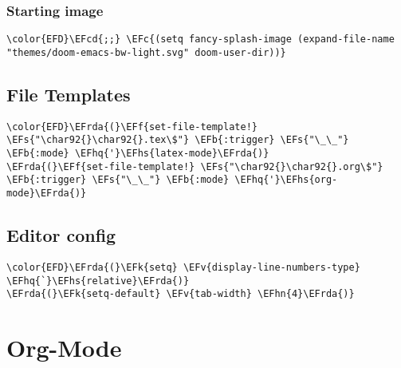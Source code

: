 \documentclass[12pt]{article}
\theoremstyle{plain}%
\theoremstyle{definition}
\theoremstyle{remark}
\newcommand{\EFc}[1]{\textcolor{EFc}{#1}} %
\newcommand{\EFcd}[1]{\textcolor{EFcd}{#1}} %
\newcommand{\EFs}[1]{\textcolor{EFs}{#1}} %
\newcommand{\EFk}[1]{\textcolor{EFk}{#1}} %
\newcommand{\EFb}[1]{\textcolor{EFb}{#1}} %
\newcommand{\EFf}[1]{\textcolor{EFf}{#1}} %
\newcommand{\EFv}[1]{\textcolor{EFv}{#1}} %
\newcommand{\EFhn}[1]{\textcolor{EFhn}{\textbf{#1}}} %
\newcommand{\EFhq}[1]{\textcolor{EFhq}{#1}} %
\newcommand{\EFhs}[1]{\textcolor{EFhs}{#1}} %
\newcommand{\EFrda}[1]{\textcolor{EFrda}{#1}} %
\begin{document}
\subsubsection{Starting image}
\label{sec:orgee89425}
\begin{Code}
\begin{Verbatim}
\color{EFD}\EFcd{;;} \EFc{(setq fancy-splash-image (expand-file-name "themes/doom-emacs-bw-light.svg" doom-user-dir))}
\end{Verbatim}
\end{Code}
\subsection{File Templates}
\label{sec:org3dfba4c}
\begin{Code}
\begin{Verbatim}
\color{EFD}\EFrda{(}\EFf{set-file-template!} \EFs{"\char92{}\char92{}.tex\$"} \EFb{:trigger} \EFs{"\_\_"} \EFb{:mode} \EFhq{'}\EFhs{latex-mode}\EFrda{)}
\EFrda{(}\EFf{set-file-template!} \EFs{"\char92{}\char92{}.org\$"} \EFb{:trigger} \EFs{"\_\_"} \EFb{:mode} \EFhq{'}\EFhs{org-mode}\EFrda{)}
\end{Verbatim}
\end{Code}
\subsection{Editor config}
\label{sec:org40dfb55}
\begin{Code}
\begin{Verbatim}
\color{EFD}\EFrda{(}\EFk{setq} \EFv{display-line-numbers-type} \EFhq{`}\EFhs{relative}\EFrda{)}
\EFrda{(}\EFk{setq-default} \EFv{tab-width} \EFhn{4}\EFrda{)}
\end{Verbatim}
\end{Code}
\section{Org-Mode}
\label{sec:orged6aed9}
\end{document}
